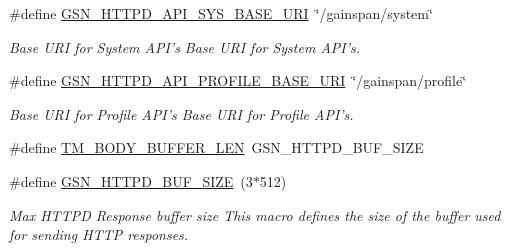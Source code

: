 \begin{DoxyCompactItemize}
\item 
\#define \hyperlink{a00666_gad35e4cccb1b941e871e8679071c231ff}{GSN\_\-HTTPD\_\-API\_\-SYS\_\-BASE\_\-URI}~\char`\"{}/gainspan/system\char`\"{}
\begin{DoxyCompactList}\small\item\em Base URI for System API's Base URI for System API's. \end{DoxyCompactList}\item 
\#define \hyperlink{a00666_ga0d52f5c67895eb49f4680ca1b4d97498}{GSN\_\-HTTPD\_\-API\_\-PROFILE\_\-BASE\_\-URI}~\char`\"{}/gainspan/profile\char`\"{}
\begin{DoxyCompactList}\small\item\em Base URI for Profile API's Base URI for Profile API's. \end{DoxyCompactList}\item 
\#define \hyperlink{a00508_a7a853f860dc83c4b0b428b7c1a383eff}{TM\_\-BODY\_\-BUFFER\_\-LEN}~GSN\_\-HTTPD\_\-BUF\_\-SIZE
\item 
\#define \hyperlink{a00666_ga65ea05b0dabc770285f0a18270af5fc7}{GSN\_\-HTTPD\_\-BUF\_\-SIZE}~(3$\ast$512)
\begin{DoxyCompactList}\small\item\em Max HTTPD Response buffer size This macro defines the size of the buffer used for sending HTTP responses. \end{DoxyCompactList}\end{DoxyCompactItemize}
